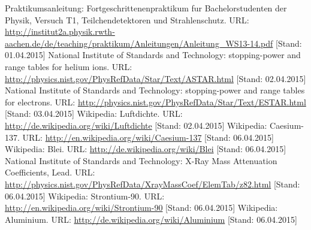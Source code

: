 \documentclass{../Misc/MontavonLaTeX/Montavon}
\begin{document}
\newpage
\begin{thebibliography}{xxxx}
 Praktikumsanleitung: Fortgeschrittenenpraktikum fur Bachelorstudenten der Physik, Versuch T1, Teilchendetektoren und Strahlenschutz. URL: \url{http://institut2a.physik.rwth-aachen.de/de/teaching/praktikum/Anleitungen/Anleitung_WS13-14.pdf} [Stand: 01.04.2015]
 National Institute of Standards and Technology: stopping-power and range tables for helium ions. URL: \url{http://physics.nist.gov/PhysRefData/Star/Text/ASTAR.html} [Stand: 02.04.2015]
 National Institute of Standards and Technology: stopping-power and range tables for electrons. URL: \url{http://physics.nist.gov/PhysRefData/Star/Text/ESTAR.html} [Stand: 03.04.2015]
 Wikipedia: Luftdichte. URL: \url{http://de.wikipedia.org/wiki/Luftdichte} [Stand: 02.04.2015]
 Wikipedia: Caesium-137. URL: \url{http://en.wikipedia.org/wiki/Caesium-137} [Stand: 06.04.2015]
 Wikipedia: Blei. URL: \url{http://de.wikipedia.org/wiki/Blei} [Stand: 06.04.2015]
 National Institute of Standards and Technology: X-Ray Mass Attenuation Coefficients, Lead. URL: \url{http://physics.nist.gov/PhysRefData/XrayMassCoef/ElemTab/z82.html} [Stand: 06.04.2015]
 Wikipedia: Strontium-90. URL: \url{http://en.wikipedia.org/wiki/Strontium-90} [Stand: 06.04.2015]
 Wikipedia: Aluminium. URL: \url{http://de.wikipedia.org/wiki/Aluminium} [Stand: 06.04.2015]
\end{thebibliography}
\end{document}
